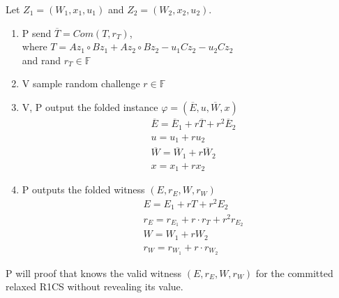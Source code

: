 \documentclass{article}
\theoremstyle{definition}
\begin{document}
Let $Z_1 = (W_1, x_1, u_1)$ and $Z_2 = (W_2, x_2, u_2)$.

\begin{enumerate}
	\item P send $\overline{T} = Com(T, r_T)$,\\
		where $T=A z_1 \circ B z_1 + A z_2 \circ B z_2 - u_1 C z_2 - u_2 C z_2$\\
		and rand $r_T \in \mathbb{F}$
	\item V sample random challenge $r \in \mathbb{F}$
	\item V, P output the folded instance $\varphi = (\overline{E}, u, \overline{W}, x)$
		\begin{align*}
			&\overline{E}=\overline{E}_1 + r \overline{T} + r^2 \overline{E}_2\\
			&u = u_1 + r u_2\\
			&\overline{W} = \overline{W}_1 + r \overline{W}_2\\
			&x = x_1 + r x_2
		\end{align*}
	\item P outputs the folded witness $(E, r_E, W, r_W)$
		\begin{align*}
			&E = E_1 + r T + r^2 E_2\\
			&r_E = r_{E_1} + r \cdot r_T + r^2 r_{E_2}\\
			&W=W_1 + r W_2\\
			&r_W = r_{W_1} + r \cdot r_{W_2}
		\end{align*}
\end{enumerate}

P will proof that knows the valid witness $(E, r_E, W, r_W)$ for the committed relaxed R1CS without revealing its value.
\end{document}
